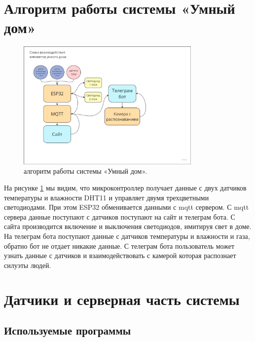 \section{Алгоритм работы системы «Умный дом»}

\begin{figure}[h!]
	\centering
	\includegraphics[width=0.8\textwidth]{./graphics/img/image25.png}
	\caption{алгоритм работы системы «Умный дом».}
	\label{fig:img25}
\end{figure}

На рисунке \ref{fig:img25} мы видим, что микроконтроллер получает данные с двух датчиков температуры и влажности DHT11 и управляет двумя трехцветными светодиодами. При этом ESP32 обменивается данными с mqtt сервером. С mqtt сервера данные поступают с датчиков поступают на сайт и телеграм бота. С сайта производится включение и выключения светодиодов, имитируя свет в доме. На телеграм бота поступают данные с датчиков температуры и влажности и газа, обратно бот не отдает никакие данные. С телеграм бота пользователь может узнать данные с датчиков и взаимодействовать с камерой которая распознает силуэты людей.

\section{Датчики и серверная часть системы}

\subsection{Используемые программы}

